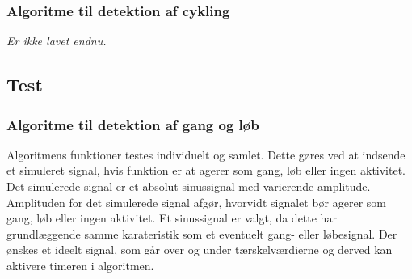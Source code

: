 \subsubsection{Algoritme til detektion af cykling}
\textit{Er ikke lavet endnu.}

\subsection{Test}
\subsubsection{Algoritme til detektion af gang og løb}
Algoritmens funktioner testes individuelt og samlet. Dette gøres ved at indsende et simuleret signal, hvis funktion er at agerer som gang, løb eller ingen aktivitet. Det simulerede signal er et absolut sinussignal med varierende amplitude. Amplituden for det simulerede signal afgør, hvorvidt signalet bør agerer som gang, løb eller ingen aktivitet. Et sinussignal er valgt, da dette har grundlæggende samme karateristik som et eventuelt gang- eller løbesignal. Der ønskes et ideelt signal, som går over og under tærskelværdierne og derved kan aktivere timeren i algoritmen.

